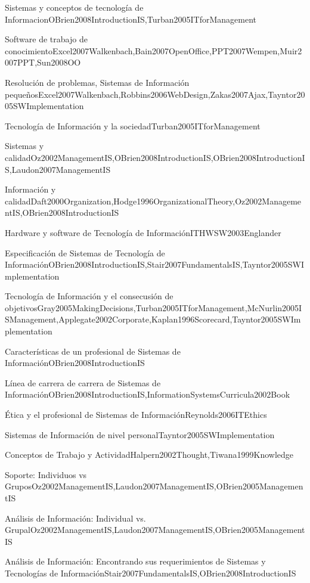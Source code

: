\begin{LU1}{Sistemas y conceptos de tecnología de Informacion}{OBrien2008IntroductionIS,Turban2005ITforManagement}{}
\begin{LU2}{Software de trabajo de conocimiento}{Excel2007Walkenbach,Bain2007OpenOffice,PPT2007Wempen,Muir2007PPT,Sun2008OO}{}
\begin{LU3}{Resolución de problemas, Sistemas de Información pequeños}{Excel2007Walkenbach,Robbins2006WebDesign,Zakas2007Ajax,Tayntor2005SWImplementation}{}
\begin{LU4}{Tecnología de Información y la sociedad}{Turban2005ITforManagement}{}
\begin{LU5}{Sistemas y calidad}{Oz2002ManagementIS,OBrien2008IntroductionIS,OBrien2008IntroductionIS,Laudon2007ManagementIS}{}
\begin{LU6}{Información y calidad}{Daft2000Organization,Hodge1996OrganizationalTheory,Oz2002ManagementIS,OBrien2008IntroductionIS}{}
\begin{LU7}{Hardware y software de Tecnología de Información}{ITHWSW2003Englander}{}
\begin{LU8}{Especificación de Sistemas de Tecnología de Información}{OBrien2008IntroductionIS,Stair2007FundamentalsIS,Tayntor2005SWImplementation}{}
\begin{LU9}{Tecnología de Información y el consecusión de objetivos}{Gray2005MakingDecisions,Turban2005ITforManagement,McNurlin2005ISManagement,Applegate2002Corporate,Kaplan1996Scorecard,Tayntor2005SWImplementation}{}
\begin{LU10}{Características de un profesional de Sistemas de Información}{OBrien2008IntroductionIS}{}
\begin{LU11}{Línea de carrera de carrera de Sistemas de Información}{OBrien2008IntroductionIS,InformationSystemsCurricula2002Book}{}
\begin{LU12}{Ética y el profesional de Sistemas de Información}{Reynolds2006ITEthics}{}
\begin{LU13}{Sistemas de Información de nivel personal}{Tayntor2005SWImplementation}{}
\begin{LU13.01}[LU13]{Conceptos de Trabajo y Actividad}{Halpern2002Thought,Tiwana1999Knowledge}{}
\begin{LU13.02}[LU13]{Soporte: Individuos vs Grupos}{Oz2002ManagementIS,Laudon2007ManagementIS,OBrien2005ManagementIS}{}
\begin{LU13.03}[LU13]{Análisis de Información: Individual vs. Grupal}{Oz2002ManagementIS,Laudon2007ManagementIS,OBrien2005ManagementIS}{}
\begin{LU13.04}[LU13]{Análisis de Información: Encontrando sus requerimientos de Sistemas y Tecnologías de Información}{Stair2007FundamentalsIS,OBrien2008IntroductionIS}{}
\end{LU13.04}
\end{LU13.03}
\end{LU13.02}
\end{LU13.01}
\end{LU13}
\end{LU12}
\end{LU11}
\end{LU10}
\end{LU9}
\end{LU8}
\end{LU7}
\end{LU6}
\end{LU5}
\end{LU4}
\end{LU3}
\end{LU2}
\end{LU1}
